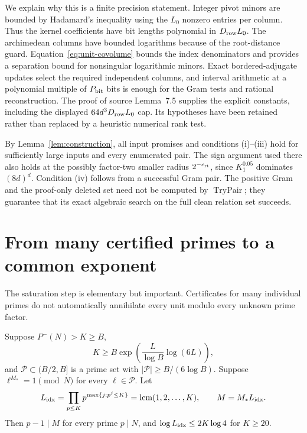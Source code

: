 We explain why this is a finite precision statement.  Integer
pivot minors are bounded by Hadamard's inequality using the
\(L_0\) nonzero entries per column.  Thus the kernel coefficients
have bit lengths polynomial in \(D_{\rm row}L_0\).
The archimedean columns have bounded logarithms because of the
root-distance guard.  Equation~\eqref{eq:unit-covolume} bounds
the index denominators and provides a separation bound for
nonsingular logarithmic minors.  Exact bordered-adjugate updates
select the required independent columns, and interval arithmetic
at a polynomial multiple of \(P_{\rm bit}\) bits is enough for
the Gram tests and rational reconstruction.  The proof of source
Lemma~7.5 supplies the explicit constants, including the displayed
\(64d^3D_{\rm row}L_0\) cap.  Its hypotheses have been retained
rather than replaced by a heuristic numerical rank test.

By Lemma~\ref{lem:construction}, all input promises and conditions
(i)--(iii) hold for sufficiently large inputs and every enumerated
pair.  The sign argument used there also holds at the possibly
factor-two smaller radius \(2^{-e_{\rm rt}}\), since
\(K_1^{0.05}\) dominates \((8d)^d\).
Condition (iv) follows from a successful Gram pair.  The positive
Gram and the proof-only deleted set need not be computed by
\(\operatorname{TryPair}\); they guarantee that its exact algebraic
search on the full clean relation set succeeds.

\section{From many certified primes to a common exponent}
\label{sec:saturation}

The saturation step is elementary but important.  Certificates for
many individual primes do not automatically annihilate every unit
modulo every unknown prime factor.

\begin{lemma}\label{lem:saturation}
Suppose \(P^-(N)>K\ge B\),
\[
 K\ge B\exp\left(\frac L{\log B}\log(6L)\right),
\]
and \(\mathcal P\subset(B/2,B]\) is a prime set with
\(|\mathcal P|\ge B/(6\log B)\).  Suppose
\(\ell^{M_*}=1\pmod N\) for every \(\ell\in\mathcal P\).
Let
\[
 L_{\rm idx}=\prod_{p\le K}p^{\max\{j:p^j\le K\}}
              =\operatorname{lcm}(1,2,\ldots,K),
 \qquad M=M_*L_{\rm idx}.
\]
Then \(p-1\mid M\) for every prime \(p\mid N\), and
\(\log L_{\rm idx}\le2K\log4\) for \(K\ge20\).
\end{lemma}

